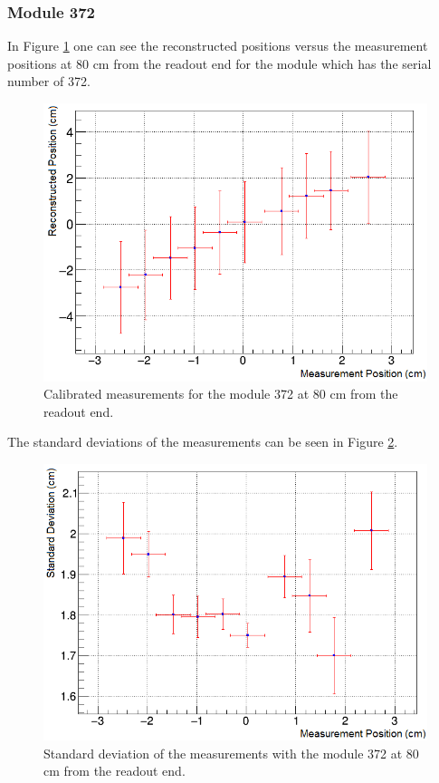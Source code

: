 \documentclass[a4paper]{article}\linespread{1.4}
\begin{document}
\subsubsection{Module 372} 
In Figure \ref{fig:72m} one can see the reconstructed positions versus the measurement positions at 80 cm from the readout end for the module which has the serial number of 372.
\begin{figure}[h!] \hspace*{-0cm} \includegraphics[width=120mm,scale=2.0]{figures/72m.png} \caption{Calibrated measurements for the module 372 at 80 cm from the readout end.}  \label{fig:72m}\end{figure}
The standard deviations of the measurements can be seen in Figure \ref{fig:72s}.
\begin{figure}[h!] \hspace*{-0cm} \includegraphics[width=120mm,scale=2.0]{figures/72s.png} \caption{Standard deviation of the measurements with the module 372 at 80 cm from the readout end.}  \label{fig:72s}\end{figure}
\end{document}
